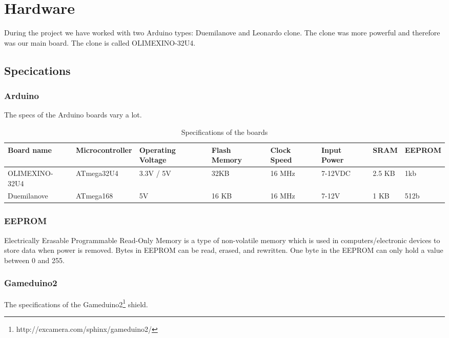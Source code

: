 \chapter{Hardware} %

During the project we have worked with two Arduino types: Duemilanove and Leonardo clone.
The clone was more powerful and therefore was our main board. The clone is called
OLIMEXINO-32U4.
\section{Specications}

\subsection*{Arduino}
The specs of the Arduino boards vary a lot. 

\begin{table}[h]
\resizebox{16cm}{!} {
    \begin{tabular}{l|l|l|l|l|l|l|l}
    Board name     & Microcontroller & Operating Voltage & Flash Memory & Clock Speed & Input Power & SRAM & EEPROM  \\ \hline
    OLIMEXINO-32U4 & ATmega32U4      & 3.3V / 5V         & 32KB         & 16 MHz      & 7-12VDC     & 2.5 KB & 1kb \\
    Duemilanove    & ATmega168       & 5V                & 16 KB        & 16 MHz      & 7-12V       & 1 KB& 512b   \\
    \end{tabular}
}
    \caption{Specifications of the boards}
\end{table}
\subsection*{EEPROM}
Electrically Erasable Programmable Read-Only Memory is a type of non-volatile memory which is used in computers/electronic devices to store data when power is removed. Bytes in EEPROM can be read, erased, and rewritten. One byte in the EEPROM can only hold a value between 0 and 255.

\newpage
\subsection*{Gameduino2}
The specifications of the Gameduino2\footnote{http://excamera.com/sphinx/gameduino2/} shield.

